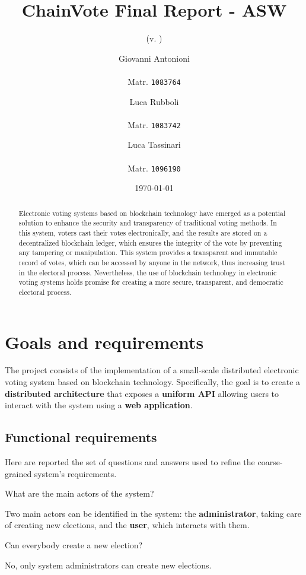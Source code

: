 \documentclass{scrartcl}
\title{\LARGE
    ChainVote Final Report - ASW
}
\subtitle{(v. \version)}
\author{
    Giovanni Antonioni \\ \emailaddr{giovanni.antonioni2@studio.unibo.it} \\ Matr. \texttt{1083764}
    \and 
    Luca Rubboli \\ \emailaddr{luca.rubboli2@studio.unibo.it} \\ Matr. \texttt{1083742}
    \and
    Luca Tassinari \\ \emailaddr{luca.tassinari10@studio.unibo.it} \\ Matr. \texttt{1096190}
}
\date{\today}
\begin{document}
\maketitle

\begin{abstract}
    Electronic voting systems based on blockchain technology have emerged as a potential solution to enhance the security and transparency of traditional voting methods. In this system, voters cast their votes electronically, and the results are stored on a decentralized blockchain ledger, which ensures the integrity of the vote by preventing any tampering or manipulation. This system provides a transparent and immutable record of votes, which can be accessed by anyone in the network, thus increasing trust in the electoral process. Nevertheless, the use of blockchain technology in electronic voting systems holds promise for creating a more secure, transparent, and democratic electoral process.
\end{abstract}

\section{Goals and requirements}

The project consists of the implementation of a small-scale distributed electronic voting system based on blockchain technology.
%
Specifically, the goal is to create a \textbf{distributed architecture} that exposes a \textbf{uniform API} allowing users to interact with the system using a \textbf{web application}.

\subsection{Functional requirements}

Here are reported the set of questions and answers used to refine the coarse-grained system's requirements.

\begin{Question}
    What are the main actors of the system?
\end{Question}
\begin{Answer}
    Two main actors can be identified in the system: the \textbf{administrator}, taking care of creating new elections, and the \textbf{user}, which interacts with them.
\end{Answer}

\begin{Question}
    Can everybody create a new election?
\end{Question}
\begin{Answer}
    No, only system administrators can create new elections.
\end{Answer}
\end{document}
